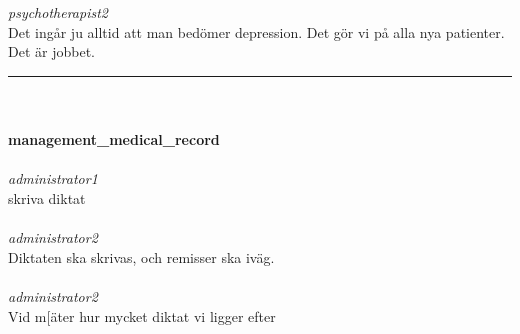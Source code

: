 \documentclass[12pt,a4paper,oneside]{article}
\begin{document}
\ \\\ \\
 { \it   psychotherapist2 %
}\\
Det ing{\aa}r ju alltid att man bed{\"o}mer depression. Det g{\"o}r vi p{\aa} alla nya patienter. Det {\"a}r jobbet.  %


\hrule
\ \\\ \\{\bf management\_medical\_record }
\\\ \\%
 { \it administrator1 %
}\\
 skriva diktat %
\ \\\ \\
 { \it   administrator2 %
}\\
Diktaten ska skrivas, och remisser ska iv{\"a}g. %
\ \\\ \\
 { \it   administrator2 %
}\\
Vid m[{\"a}ter hur mycket diktat vi ligger efter %
\end{document}
